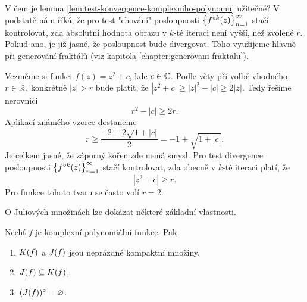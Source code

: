 V čem je lemma \ref{lem:test-konvergence-komplexniho-polynomu} užitečné? V podstatě nám říká, že pro test "chování" posloupnosti $\left\{f^{\circ k}(z)\right\}_{n=1}^\infty$ stačí kontrolovat, zda absolutní hodnota obrazu v $k$-té iteraci není vyšší, než zvolené $r$. Pokud ano, je již jasné, že posloupnost bude divergovat. Toho využijeme hlavně při generování fraktálů (viz kapitola \ref{chapter:generovani-fraktalu}).
\begin{example}
    Vezměme si funkci $f(z)=z^2+c$, kde $c\in\mathbb{C}$. Podle věty při volbě vhodného $r\in\mathbb{R}$, konkrétně $|z|>r$ bude platit, že $|z^2+c|\geqslant|z|^2-|c|\geqslant 2|z|$. Tedy řešíme nerovnici
    \[r^2-|c|\geqslant 2r.\]
    Aplikací známého vzorce dostaneme
    \[r\geqslant\frac{-2+2\sqrt{1+|c|}}{2}=-1+\sqrt{1+|c|}.\]
    Je celkem jasné, že záporný kořen zde nemá smysl. Pro test divergence posloupnosti $\left\{f^{\circ k}(z)\right\}_{n=1}^\infty$ stačí kontrolovat, zda obecně v $k$-té iteraci platí, že
    \[|z^2+c|\geqslant r.\]
    Pro funkce tohoto tvaru se často volí $r=2$.
\end{example}
O Juliových množinách lze dokázat některé základní vlastnosti.
\begin{theorem}\label{thm:vztah-kf-a-jf}
    Nechť $f$ je komplexní polynomiální funkce. Pak
    \begin{enumerate}[label=(\roman*)]
        \item\label{thm:kompaktnost-kf-jf} $K(f)$ a $J(f)$ jsou neprázdné kompaktní množiny,
        \item\label{thm:jf-podmnozina-kf} $J(f)\subseteq K(f)$,
        \item\label{thm:vnitrek-jf-neprazdny} $(J(f))^\circ=\varnothing$.
    \end{enumerate}
\end{theorem}
